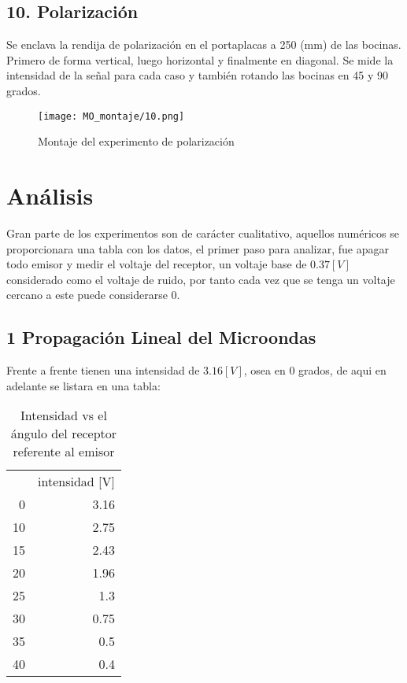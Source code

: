 \documentclass[a4paper,twocolumn,10pt]{article}
\begin{document}
\subsection*{10. Polarización}
Se enclava la rendija de polarización en el portaplacas a 250 (mm) de las bocinas. Primero de forma vertical, luego horizontal y finalmente en diagonal. Se mide la intensidad de la señal para cada caso y también rotando las bocinas en 45 y 90 grados.
\begin{figure}[H]
    \centering
    \texttt{[image: MO\_montaje/10.png]}
    \caption{Montaje del experimento de polarización}
    \label{fig:montpol}
\end{figure}





\section{Análisis}
Gran parte de los experimentos son de carácter cualitativo, aquellos numéricos se proporcionara una tabla con los datos, el primer paso para analizar, fue apagar todo emisor y medir el voltaje del receptor, un voltaje base de $0.37 [V]$ considerado como el voltaje de ruido, por tanto cada vez que se tenga un voltaje cercano a este puede considerarse 0.

\subsection*{1 Propagación Lineal del Microondas}
Frente a frente tienen una intensidad de $3.16 [V]$, osea en $0$ grados, de aqui en adelante se listara en una tabla:
\begin{table}[H]
\centering
\caption{Intensidad vs el ángulo del receptor referente al emisor}
\begin{tabular}{rr}
\rowcolor[rgb]{0.753,0.753,0.753} \multicolumn{1}{l}{angulo [grad]} & \multicolumn{1}{l}{intensidad [V]}  \\
0                                                                   & 3.16                                \\
10                                                                  & 2.75                                \\
15                                                                  & 2.43                                \\
20                                                                  & 1.96                                \\
25                                                                  & 1.3                                 \\
30                                                                  & 0.75                                \\
35                                                                  & 0.5                                 \\
40                                                                  & 0.4                                
\end{tabular}
\end{table}
\end{document}

